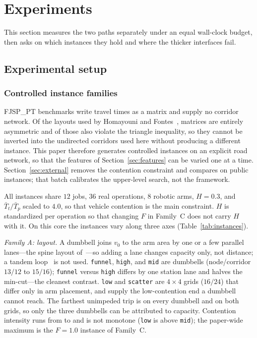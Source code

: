 \section{Experiments}
\label{sec:Chapter_V}

This section measures the two paths separately under an equal wall-clock budget, then asks on which instances they hold and where the thicker interfaces fail.

\subsection{Experimental setup}
\label{sec:instances}

\subsubsection{Controlled instance families}
FJSP\_PT benchmarks write travel times as a matrix and supply no corridor network.
Of the \PubNLayout{} layouts used by Homayouni and Fontes~\cite{homayouni2021production},
\PubNLayoutAsym{} matrices are entirely asymmetric and \PubNLayoutBad{} of those also violate the triangle inequality, so they cannot be inverted into the undirected corridors used here without producing a different instance.
This paper therefore generates controlled instances on an explicit road network, so that the features of Section~\ref{sec:features} can be varied one at a time.
Section~\ref{sec:external} removes the contention constraint and compares on public instances; that batch calibrates the upper-level search, not the framework.

All instances share $12$ jobs, $36$ real operations, $8$ robotic arms, $H=0.3$, and $\bar{T}_t/\bar{T}_p$ scaled to $4.0$, so that vehicle contention is the main constraint.
$H$ is standardized per operation so that changing $F$ in Family~C does not carry $H$ with it.
On this core the instances vary along three axes (Table~\ref{tab:instances}).

\emph{Family A: layout.}
A dumbbell joins $v_0$ to the arm area by one or a few parallel lanes---the spine layout of~\cite{suh2022spine}---so adding a lane changes capacity only, not distance; a tandem loop~\cite{rahimikelarijani2020tandem} is not used.
\texttt{funnel}, \texttt{high}, and \texttt{mid} are dumbbells (node/corridor $13/12$ to $15/16$); \texttt{funnel} versus \texttt{high} differs by one station lane and halves the min-cut---the cleanest contrast.
\texttt{low} and \texttt{scatter} are $4\times4$ grids ($16/24$) that differ only in arm placement, and supply the low-contention end a dumbbell cannot reach.
The farthest unimpeded trip is \LegDumbbell{} on every dumbbell and \LegGrid{} on both grids, so only the three dumbbells can be attributed to capacity.
Contention intensity runs from \ContentionAHi{} to \ContentionLo{} and is not monotone (\texttt{low} is above \texttt{mid}); the paper-wide maximum \ContentionHi{} is the $F=1.0$ instance of Family~C.

